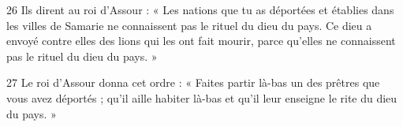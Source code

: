 
26 Ils dirent au roi d’Assour : « Les nations que tu as déportées et établies dans les villes de Samarie ne connaissent pas le rituel du dieu du pays. Ce dieu a envoyé contre elles des lions qui les ont fait mourir, parce qu’elles ne connaissent pas le rituel du dieu du pays. »

27 Le roi d’Assour donna cet ordre : « Faites partir là-bas un des prêtres que vous avez déportés ; qu’il aille habiter là-bas et qu’il leur enseigne le rite du dieu du pays. »